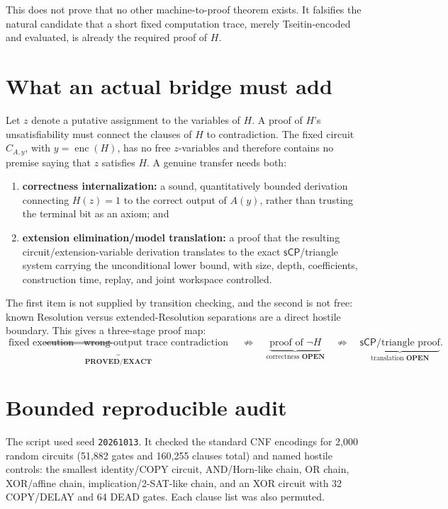 \documentclass[11pt]{article}
\newcommand{\sCP}{\mathsf{sCP}}
\newcommand{\EXACT}{\textbf{PROVED/EXACT}}
\newcommand{\OPEN}{\textbf{OPEN}}
\begin{document}
This does not prove that no other machine-to-proof theorem exists.  It
falsifies the natural candidate that a short fixed computation trace, merely
Tseitin-encoded and evaluated, is already the required proof of \(H\).

\section{What an actual bridge must add}
Let \(z\) denote a putative assignment to the variables of \(H\).  A proof of
\(H\)'s unsatisfiability must connect the clauses of \(H\) to contradiction.
The fixed circuit \(C_{A,y}\), with \(y=\operatorname{enc}(H)\), has no free
\(z\)-variables and therefore contains no premise saying that \(z\) satisfies
\(H\).  A genuine transfer needs both:
\begin{enumerate}
\item \textbf{correctness internalization:} a sound, quantitatively bounded
  derivation connecting \(H(z)=1\) to the correct output of \(A(y)\), rather
  than trusting the terminal bit as an axiom; and
\item \textbf{extension elimination/model translation:} a proof that the
  resulting circuit/extension-variable derivation translates to the exact
  \(\sCP\)/triangle system carrying the unconditional lower bound, with size,
  depth, coefficients, construction time, replay, and joint workspace
  controlled.
\end{enumerate}
The first item is not supplied by transition checking, and the second is not
free: known Resolution versus extended-Resolution separations are a direct
hostile boundary.  This gives a three-stage proof map:
\[
 \underbrace{\text{fixed execution}\Rightarrow
 \text{wrong-output trace contradiction}}_{\EXACT}
 \quad\not\Rightarrow\quad
 \underbrace{\text{proof of }\neg H}_{\text{correctness }\OPEN}
 \quad\not\Rightarrow\quad
 \underbrace{\sCP\text{/triangle proof}}_{\text{translation }\OPEN}.       \tag{2}
\]

\section{Bounded reproducible audit}
The script
 used seed
\texttt{20261013}.  It checked the standard CNF encodings for 2,000 random
circuits (51,882 gates and 160,255 clauses total) and named hostile controls:
the smallest identity/COPY circuit, AND/Horn-like chain, OR chain, XOR/affine
chain, implication/2-SAT-like chain, and an XOR circuit with 32 COPY/DELAY and
64 DEAD gates.  Each clause list was also permuted.
\end{document}
